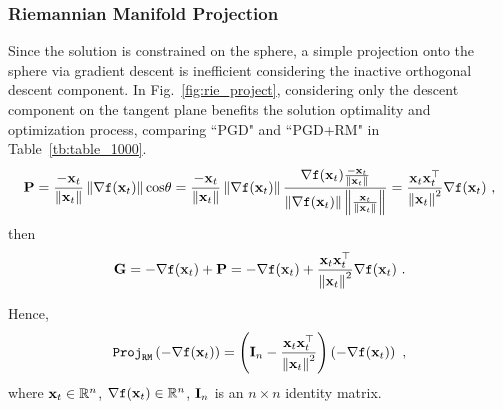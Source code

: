 \subsubsection{Riemannian Manifold Projection}
Since the solution is constrained on the sphere, a simple projection onto the sphere via gradient descent is inefficient considering the inactive orthogonal descent component.
In Fig.~\ref{fig:rie_project}, considering only the descent component on the tangent plane benefits the solution optimality and optimization process, comparing ``PGD" and ``PGD+RM" in Table~\ref{tb:table_1000}.
%
\begin{equation}
\begin{aligned}
\label{eq:P}
\mathbf{P} = \frac{-\mathbf{x}_t}{\left\lVert\mathbf{x}_t\right\rVert} \left\lVert\nabla \texttt{f}(\mathbf{x}_t)\right\rVert \text{cos}\theta
= \frac{-\mathbf{x}_t}{\left\lVert\mathbf{x}_t\right\rVert} \left\lVert\nabla \texttt{f}(\mathbf{x}_t)\right\rVert \frac{\nabla \texttt{f}(\mathbf{x}_t) \frac{-\mathbf{x}_t}{\left\lVert\mathbf{x}_t\right\rVert}}{\left\lVert\nabla \texttt{f}(\mathbf{x}_t)\right\rVert \left\Vert \frac{\mathbf{x}_t}{\left\lVert\mathbf{x}_t\right\rVert}\right\Vert}
= \frac{\mathbf{x}_t \mathbf{x}^\top_t}{\left\lVert \mathbf{x}_t \right\rVert^2} \nabla \texttt{f}(\mathbf{x}_t)\ ,
\end{aligned}
\end{equation}
%
then
\begin{equation}
\begin{aligned}
\label{eq:G}
\mathbf{G}
= -\nabla \texttt{f}(\mathbf{x}_t) + \mathbf{P}
= -\nabla \texttt{f}(\mathbf{x}_t) + \frac{\mathbf{x}_t \mathbf{x}^\top_t}{\left\lVert \mathbf{x}_t \right\rVert^2} \nabla \texttt{f}(\mathbf{x}_t)\ .
\end{aligned}
\end{equation}

Hence,
%
\begin{equation}
\begin{aligned}
\label{eq:rie_detail}
\texttt{Proj}_{\texttt{RM}}\left( -\nabla \texttt{f}(\mathbf{x}_t) \right)
= \left( \mathbf{I}_n - \frac{\mathbf{x}_t \mathbf{x}^\top_t}{\left\lVert \mathbf{x}_t \right\rVert^2} \right) \left( -\nabla \texttt{f}(\mathbf{x}_t) \right)\ ,
\end{aligned}
\end{equation}
where $\mathbf{x}_t \in \mathbb{R}^n$, $\nabla \texttt{f}(\mathbf{x}_t) \in \mathbb{R}^n$, $\mathbf{I}_n$ is an $n \times n$ identity matrix.

